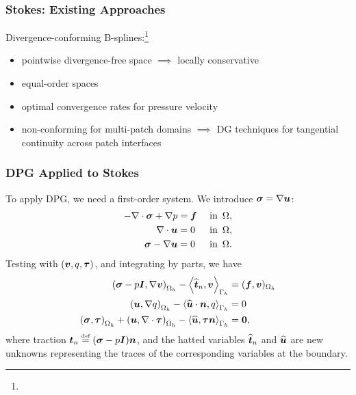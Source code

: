 \documentclass[mathserif]{beamer}
\newcommand{\eqdef}{\stackrel{\text{\tiny def}}{=}}
\newcommand{\NVRvect}[1]{\ensuremath\boldsymbol{#1}}
\newcommand{\vect}[1]{\ensuremath\boldsymbol{#1}}
\newcommand{\NVRtensor}[1]{\NVRvect{#1}}
\newcommand{\NVRgrad}{\nabla}
\newcommand{\NVRdiv}{\NVRgrad \cdot}
\newcommand{\pecosbold}[1]{{\color{pecos2}{#1}}}
\newcommand{\FootSize}{\scriptsize}
\begin{document}
\begin{frame}
\frametitle{Stokes: Existing Approaches}
Divergence-conforming B-splines:\footnote{\FootSize {}}
\begin{itemize}
\item pointwise divergence-free space $\implies$ locally conservative
\item equal-order spaces
\item optimal convergence rates for pressure \pecosbold{and} velocity
\item non-conforming for multi-patch domains $\implies$ DG techniques for tangential continuity across patch interfaces
\end{itemize}
\end{frame}

\begin{frame}
\frametitle{DPG Applied to Stokes}

To apply DPG, we need a first-order system.  We introduce $\NVRtensor{\sigma}= \NVRgrad
\vect{u}$:
\begin{align*}
- \NVRdiv \NVRtensor{\sigma} + \NVRgrad p &= \vect{f} & \text{ in } \, \Omega, \\
 \NVRdiv \vect{u} &= 0 & \text{ in } \, \Omega, \\
 \NVRtensor{\sigma} - \NVRgrad \vect{u} &= 0 & \text{ in } \, \Omega.
\end{align*}
Testing with $(\vect{v},q,\vect{\tau})$, and integrating by parts, we have
\begin{align*}
\left(\NVRtensor{\sigma} - p \NVRtensor{I}, \NVRgrad \vect{v} \right)_{\Omega_{h}} - \left\langle \widehat{\vect{t}}_{n}, \vect{v} \right\rangle_{\Gamma_{h}} &= (\vect{f}, \vect{v} )_{\Omega_{h}}\\
\left(\vect{u}, \NVRgrad q \right)_{\Omega_{h}} -  \left\langle \widehat{\vect{u}} \cdot \vect{n}, q  \right\rangle_{\Gamma_{h}} &= 0\\
\left( \NVRtensor{\sigma}, \NVRtensor{\tau} \right)_{\Omega_{h}} + \left( \vect{u}, \NVRdiv \NVRtensor{\tau} \right)_{\Omega_{h}} - \left\langle \widehat{\vect{u}}, \NVRtensor{\tau} \vect{n}  \right\rangle_{\Gamma_{h}} &= \NVRtensor{0},
\end{align*}
where traction $\vect{t}_{n} \eqdef ( \NVRtensor{\sigma} - p \NVRtensor{I} ) \vect{n}$, and the hatted variables $\widehat{\vect{t}}_{n}$ and $\widehat{\vect{u}}$ are new unknowns representing the traces of the corresponding variables at the boundary.

\end{frame}
\end{document}

